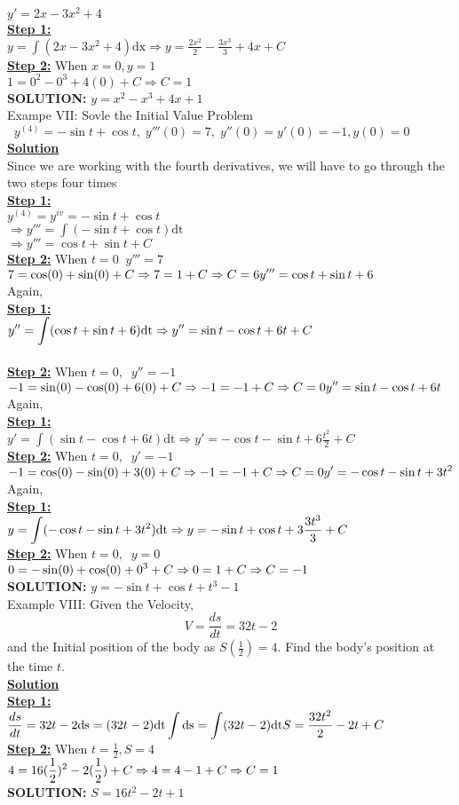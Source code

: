 \documentclass[a4paper 11pt]{article}
\newcommand{\bt}[1]{\textbf{#1}}
\newcommand{\NI}{\noindent}
\newcommand{\IVP}{Initial Value Problem }
\newcommand{\dsp}{\displaystyle}
\newcommand{\be}{\(\dsp} %
\newcommand{\ee}{\)\\[0.3cm]} %
\newcommand{\sol}{\bt{\NI\underline{Solution}}\\[0.2cm]}
\newcommand{\st}{\bt{\underline{Step 1:}}\\[0.2cm]}
\newcommand{\sprime}{'}
\newcommand{\dprime}{''}
\newcommand{\tprime}{'''}
\newcommand{\stn}[1]{\bt{\underline{Step 2:}} When \be#1\ee}
\newcommand{\imp}{\Rightarrow}
\renewcommand{\sp}{\\[0.3cm]}
\newcommand{\spn}[1]{\\[#1]}
\begin{document}
\be y\sprime = 2x - 3x^2 + 4\ee
\st
\be y = \int(2x - 3x^2 + 4)\text{dx} \imp y = \frac{2x^2}{2} - \frac{3x^3}{3} + 4x + C \ee
\stn{x=0, y=1}
\be 1 = 0^2 - 0^3 + 4(0) + C \imp C = 1\ee
\bt{SOLUTION:} \be y = x^2 - x^3 + 4x + 1\ee
Exampe VII: Sovle the \IVP \be \; \; y^{(4)} = - \sin t + \cos t, \; y\tprime(0) = 7, \; y\dprime(0) = y\sprime(0) = -1, y(0) = 0 \ee 
\sol
Since we are working with the fourth derivatives, we will have to go through the two steps four times\\
\st
\be y^{(4)} = y^{iv} = - \sin t + \cos t \ee
\be \imp y\tprime = \int(-\sin t + \cos t)\text{dt} \ee
\be \imp y\tprime = \cos t + \sin t + C \ee 
\stn{ t=0\; \; y\tprime = 7}
\be 
7 = \cos(0) + \sin(0) + C \\  
\imp 7 = 1 + C \imp C = 6 \spn{0.2cm}
y\tprime = \cos t + \sin t + 6
\ee
\newpage
\NI Again,\sp
\st
\be
y\dprime = \int(\cos t + \sin t + 6)\text{dt} \\
\imp y\dprime = \sin t - \cos t + 6t + C
\ee \spn{0.1cm}
\stn{ t=0, \; \; y\dprime = -1}
\be 
-1 = \sin(0) - \cos(0) + 6(0) + C \\
\imp -1 = -1 + C \imp C = 0 \spn{0.1cm}
y\dprime = \sin t - \cos t + 6t
\ee
Again,\sp
\st
\be
y\sprime = \int(\sin t - \cos t + 6t)\text{dt} \imp y\sprime = - \cos t - \sin t + 6\frac{t^2}{2} + C
\ee

\stn{ t=0, \; \; y\sprime = -1}
\be 
-1 = \cos(0) - \sin(0) + 3(0) + C \imp -1 = -1 + C \imp C = 0 \spn{0.1cm}
y\sprime = - \cos t - \sin t + 3t^2
\ee

Again,\sp
\st
\be
y = \int(-\cos t - \sin t + 3t^2)\text{dt} \\
\imp y = -\sin t + \cos t + 3 \frac{3t^3}{3} + C
\ee
\stn{ t=0, \; \; y = 0}
\be 
0 = -\sin(0) + \cos(0) + 0^3 + C \\
\imp 0 = 1 + C \imp C = -1
\ee
\bt{SOLUTION: } \be y = -\sin t + \cos t + t^3 - 1\ee
Example VIII: Given the Velocity, 
\[
V = \frac{ds}{dt} = 32t - 2
\]
and the Initial position of the body as \(S(\frac{1}{2}) = 4\). Find the body's position at the time \(t\).\sp
\sol
\st
\be
\frac{ds}{dt} = 32t - 2 \\
\text{ds} = (32t - 2)\text{dt} \\
\int \text{ds} = \int(32t - 2)\text{dt} \\
S = \frac{32t^2}{2} - 2t + C
\ee
\stn{t = \frac{1}{2}, S = 4}
\be
4 = 16(\frac{1}{2})^2 - 2 (\frac{1}{2}) + C \sp
\imp 4 = 4 - 1 + C \imp C = 1\\
\ee
\bt{SOLUTION:} \be S = 16t^2 - 2t + 1 \ee
\end{document}
